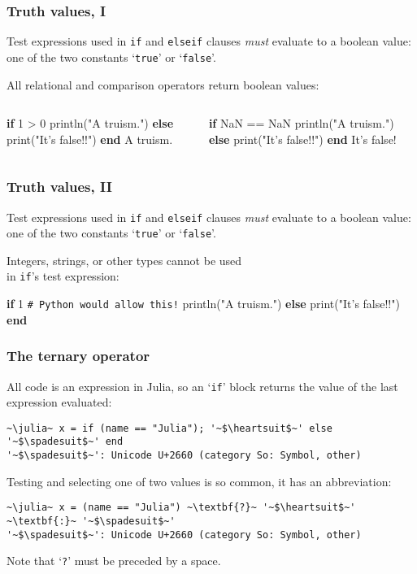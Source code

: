 \documentclass[english,serif,mathserif,xcolor=pdftex,dvipsnames,table]{beamer}
\begin{document}
\begin{frame}[fragile]
  \frametitle{Truth values, I}
  \small

  Test expressions used in \texttt{if} and \texttt{elseif} clauses
  \emph{must} evaluate to a boolean value: one of the two constants
  `\texttt{true}' or `\texttt{false}'.

  \+
  All relational and comparison operators return boolean values:
  \begin{columns}
    \begin{column}{0.5\textwidth}
\begin{semiverbatim}
\julia \textbf{if} 1 > 0
    println("A truism.")
  \textbf{else}
    print("It's false!!")
  \textbf{end}
A truism.
\end{semiverbatim}
    \end{column}
    \begin{column}{0.5\textwidth}
\begin{semiverbatim}
\julia \textbf{if} NaN == NaN
    println("A truism.")
  \textbf{else}
    print("It's false!!")
  \textbf{end}
It's false!
\end{semiverbatim}
    \end{column}
  \end{columns}
\end{frame}


\begin{frame}[fragile]
  \frametitle{Truth values, II}
  \small

  Test expressions used in \texttt{if} and \texttt{elseif} clauses
  \emph{must} evaluate to a boolean value: one of the two constants
  `\texttt{true}' or `\texttt{false}'.

  \+ Integers, strings, or other types cannot be used \\ in \texttt{if}'s
  test expression:
\begin{semiverbatim}
\julia \textbf{if} 1  \lstinline|# Python would allow this!|
    println("A truism.")
  \textbf{else}
    print("It's false!!")
  \textbf{end}
\end{semiverbatim}
\end{frame}


\begin{frame}[fragile]
  \frametitle{The ternary operator}
  All code is an expression in Julia, so an `\texttt{if}' block
  returns the value of the last expression evaluated:
\begin{lstlisting}
~\julia~ x = if (name == "Julia"); '~$\heartsuit$~' else '~$\spadesuit$~' end
'~$\spadesuit$~': Unicode U+2660 (category So: Symbol, other)
\end{lstlisting}

  \+ Testing and selecting one of two values is so common, it has an
  abbreviation:
\begin{lstlisting}
~\julia~ x = (name == "Julia") ~\textbf{?}~ '~$\heartsuit$~' ~\textbf{:}~ '~$\spadesuit$~'
'~$\spadesuit$~': Unicode U+2660 (category So: Symbol, other)
\end{lstlisting}
  Note that `\texttt{?}' must be preceded by a space.
\end{frame}
\end{document}
